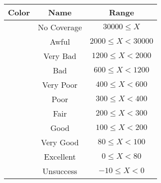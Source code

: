 \begin{tabular}{|c|c|c|}\hline
\rowcolor{Plum!20}
Color&Name&Range\\\hline\hline
\cellcolor[HTML]{aaaaaa} &No Coverage&$30000\leq X$\\\hline
\cellcolor[HTML]{820000} &Awful&$2000\leq X<30000$\\\hline
\cellcolor[HTML]{dc143c} &Very Bad&$1200\leq X<2000$\\\hline
\cellcolor[HTML]{ff0000} &Bad&$600\leq X<1200$\\\hline
\cellcolor[HTML]{fa6400} &Very Poor&$400\leq X<600$\\\hline
\cellcolor[HTML]{ffaa00} &Poor&$300\leq X<400$\\\hline
\cellcolor[HTML]{ffff00} &Fair&$200\leq X<300$\\\hline
\cellcolor[HTML]{00d228} &Good&$100\leq X<200$\\\hline
\cellcolor[HTML]{00a032} &Very Good&$80\leq X<100$\\\hline
\cellcolor[HTML]{00703c} &Excellent&$0\leq X<80$\\\hline
\cellcolor[HTML]{1e90ff} &Unsuccess&$-10\leq X<0$\\\hline
\end{tabular}
